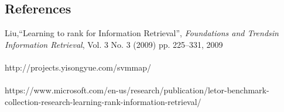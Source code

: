\documentclass{exam}
\begin{document}
\begin{questions}
\subsection*{References}
	Liu,``Learning to rank for Information Retrieval'', \textit{Foundations and Trends\textregistered \:in Information Retrieval}, Vol. 3 No. 3 (2009) pp. 225–331, 2009 \\ \\
	http://projects.yisongyue.com/svmmap/ \\ \\
	https://www.microsoft.com/en-us/research/publication/letor-benchmark-collection-research-learning-rank-information-retrieval/
\end{questions}
\end{document}
